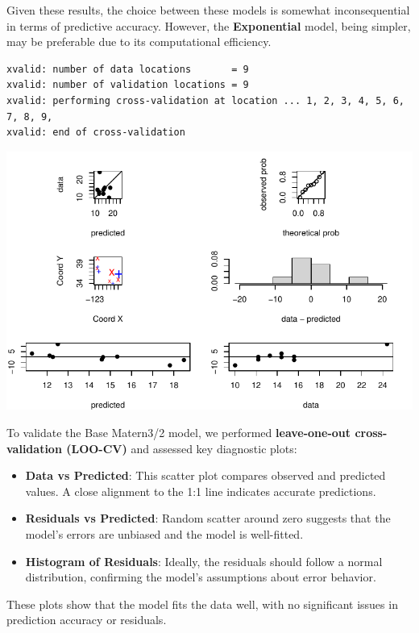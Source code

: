 \documentclass[
  11pt,
]{article}
\begin{document}
Given these results, the choice between these models is somewhat
inconsequential in terms of predictive accuracy. However, the
\textbf{Exponential} model, being simpler, may be preferable due to its
computational efficiency.

\begin{verbatim}
xvalid: number of data locations       = 9
xvalid: number of validation locations = 9
xvalid: performing cross-validation at location ... 1, 2, 3, 4, 5, 6, 7, 8, 9, 
xvalid: end of cross-validation
\end{verbatim}

\includegraphics{project_files/figure-pdf/unnamed-chunk-77-1.pdf}

To validate the Base Matern3/2 model, we performed \textbf{leave-one-out
cross-validation (LOO-CV)} and assessed key diagnostic plots:

\begin{itemize}
\item
  \textbf{Data vs Predicted}: This scatter plot compares observed and
  predicted values. A close alignment to the 1:1 line indicates accurate
  predictions.
\item
  \textbf{Residuals vs Predicted}: Random scatter around zero suggests
  that the model's errors are unbiased and the model is well-fitted.
\item
  \textbf{Histogram of Residuals}: Ideally, the residuals should follow
  a normal distribution, confirming the model's assumptions about error
  behavior.
\end{itemize}

These plots show that the model fits the data well, with no significant
issues in prediction accuracy or residuals.
\end{document}
